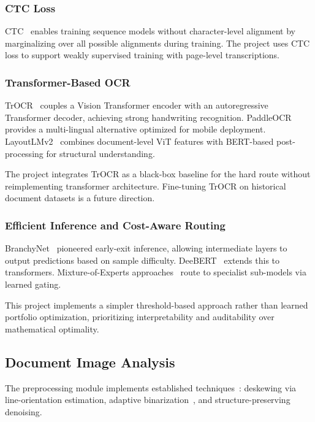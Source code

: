 \documentclass[12pt,a4paper]{article}
\begin{document}
\subsubsection{CTC Loss}

CTC~\cite{ref:graves2006} enables training sequence models without
character-level alignment by marginalizing over all possible
alignments during training. The project uses CTC loss to support
weakly supervised training with page-level transcriptions.

\subsubsection{Transformer-Based OCR}

TrOCR~\cite{ref:huang2021} couples a Vision Transformer encoder with an
autoregressive Transformer decoder, achieving strong handwriting
recognition. PaddleOCR provides a multi-lingual alternative
optimized for mobile deployment. LayoutLMv2~\cite{ref:xu2021} combines
document-level ViT features with BERT-based post-processing for
structural understanding.

The project integrates TrOCR as a black-box baseline for the hard
route without reimplementing transformer architecture. Fine-tuning
TrOCR on historical document datasets is a future direction.

\subsubsection{Efficient Inference and Cost-Aware Routing}

BranchyNet~\cite{ref:teerapittayanon2016} pioneered early-exit
inference, allowing intermediate layers to output predictions based
on sample difficulty. DeeBERT~\cite{ref:xin2020} extends this to
transformers. Mixture-of-Experts approaches~\cite{ref:shazeer2017} route
to specialist sub-models via learned gating.

This project implements a simpler threshold-based approach rather
than learned portfolio optimization, prioritizing interpretability
and auditability over mathematical optimality.

\subsection{Document Image Analysis}

The preprocessing module implements established
techniques~\cite{ref:gonzalez2017,ref:nixon2012}: deskewing via
line-orientation estimation, adaptive
binarization~\cite{ref:sauvola2000}, and structure-preserving denoising.
\end{document}
